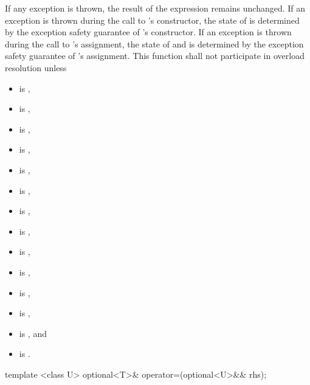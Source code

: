 \begin{itemdescr}
\pnum
\remarks
If any exception is thrown,
the result of the expression  remains unchanged.
If an exception is thrown during the call to 's constructor,
the state of  is determined by
the exception safety guarantee of 's constructor.
If an exception is thrown during the call to 's assignment,
the state of  and  is determined by
the exception safety guarantee of 's assignment.
This function shall not participate in overload resolution unless
\begin{itemize}
\item {} is ,
\item {} is ,
\item {} is ,
\item {} is ,
\item {} is ,
\item {} is ,
\item {} is ,
\item {} is ,
\item {} is ,
\item {} is ,
\item {} is ,
\item {} is ,
\item {} is , and
\item {} is .
\end{itemize}
\end{itemdescr}

%
\begin{itemdecl}
template <class U> optional<T>& operator=(optional<U>&& rhs);
\end{itemdecl}

